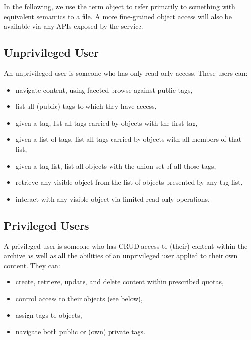 In the following, we use the term object to refer primarily to something with equivalent semantics to a file.
A more fine-grained object access will also be available via any APIs exposed by the service.

\subsection*{Unprivileged User}

An unprivileged user is someone who has only read-only access. These users can:
\begin{itemize}
	\item navigate content, using faceted browse against public tags,
	\item list all (public) tags to which they have access,
	\item given a tag, list all tags carried by objects with the first tag,
	\item given a list of tags, list all tags carried by objects with all members of that list,
	\item given a tag list, list all objects with the union set of all those tags,
	\item retrieve any visible object from the list of objects presented by any tag list,
	\item interact with any visible object via limited read only operations.
\end{itemize}

\subsection*{Privileged Users}

A privileged user is someone who has CRUD access to (their) content within the archive as well as all the abilities of an unprivileged user applied to their own content. They can:
\begin{itemize}
	\item create, retrieve, update, and delete content within prescribed quotas,
	\item control access to their objects (see below),
	\item assign tags to objects,
	\item navigate both public or (own) private tags.
\end{itemize}

